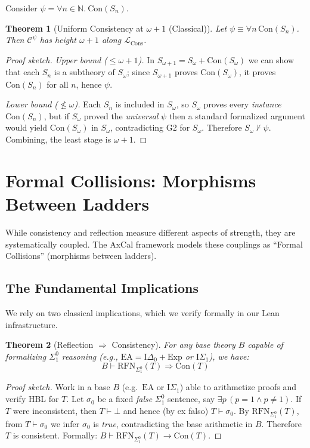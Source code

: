 \documentclass[11pt]{article}
\newtheorem{theorem}{Theorem}[section]
\newcommand{\EA}{\mathrm{EA}}
\newcommand{\ISigma}{\mathrm{I}\Sigma_1}
\newcommand{\Con}{\mathrm{Con}}
\newcommand{\RFNSigOne}{\mathrm{RFN}_{\Sigma^0_1}}
\newcommand{\LCons}{\mathcal{L}_{\mathrm{Cons}}}
\begin{document}
Consider $\psi = \forall n \in \mathbb{N}.\ \Con(S_n)$.

\begin{theorem}[Uniform Consistency at $\omega+1$ (Classical)]
Let $\psi \equiv \forall n\,\Con(S_n)$. Then $\mathcal C^\psi$ has height $\omega+1$ along $\LCons$.
\end{theorem}

\begin{proof}[Proof sketch]
\emph{Upper bound ($\le \omega{+}1$).} In $S_{\omega+1}=S_\omega+\Con(S_\omega)$ we can show that
each $S_n$ is a subtheory of $S_\omega$; since $S_{\omega+1}$ proves $\Con(S_\omega)$, it proves
$\Con(S_n)$ for all $n$, hence $\psi$.

\emph{Lower bound ($\not\le \omega$).} Each $S_n$ is included in $S_\omega$, so $S_\omega$ proves
every \emph{instance} $\Con(S_n)$, but if $S_\omega$ proved the \emph{universal} $\psi$ then a standard
formalized argument would yield $\Con(S_\omega)$ in $S_\omega$, contradicting G2 for $S_\omega$.
Therefore $S_\omega\nvdash\psi$. Combining, the least stage is $\omega+1$.
\end{proof}

\section{Formal Collisions: Morphisms Between Ladders}

While consistency and reflection measure different aspects of strength, they are systematically coupled. The AxCal framework models these couplings as ``Formal Collisions'' (morphisms between ladders).

\subsection{The Fundamental Implications}
We rely on two classical implications, which we verify formally in our Lean infrastructure.

\begin{theorem}[Reflection $\Rightarrow$ Consistency]\label{thm:RFN-implies-Con}
For any base theory $B$ capable of formalizing $\Sigma^0_1$ reasoning (e.g., $\EA = \mathrm{I}\Delta_0 + \mathrm{Exp}$ or $\ISigma$), we have:
$$B \vdash \RFNSigOne(T) \Rightarrow \Con(T)$$
\end{theorem}
\begin{proof}[Proof sketch]
Work in a base $B$ (e.g.\ $\EA$ or $\ISigma$) able to arithmetize proofs and verify HBL for $T$.
Let $\sigma_0$ be a fixed \emph{false} $\Sigma^0_1$ sentence, say $\exists p\,(p=1\wedge p\neq 1)$.
If $T$ were inconsistent, then $T\vdash \bot$ and hence (by ex falso) $T\vdash \sigma_0$.
By $\RFNSigOne(T)$, from $T\vdash \sigma_0$ we infer $\sigma_0$ is \emph{true}, contradicting the
base arithmetic in $B$. Therefore $T$ is consistent. Formally: $B\vdash \RFNSigOne(T)\to\Con(T)$.
\end{proof}
\end{document}
